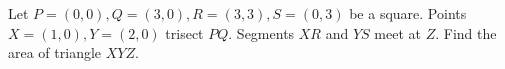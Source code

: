 Let $P=(0,0),Q=(3,0),R=(3,3),S=(0,3)$ be a square. Points $X=(1,0),Y=(2,0)$ trisect $PQ$. Segments $XR$ and $YS$ meet at $Z$. Find the area of triangle $XYZ$.
